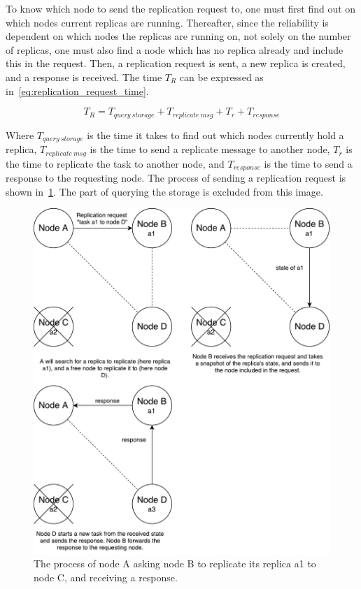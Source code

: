 \documentclass{cslthse-msc}
\begin{document}
To know which node to send the replication request to, one must first find out on which nodes current replicas are running. Thereafter, since the reliability is dependent on which nodes the replicas are running on, not solely on the number of replicas, one must also find a node which has no replica already and include this in the request. Then, a replication request is sent, a new replica is created, and a response is received. The time $T_R$ can be expressed as in~\cref{eq:replication_request_time}.

\begin{equation} \label{eq:replication_request_time}
T_R = T_{query\ storage} + T_{replicate\ msg} + T_{r} + T_{response}
\end{equation} 

Where $T_{query\ storage}$ is the time it takes to find out which nodes currently hold a replica, $T_{replicate\ msg}$ is the time to send a replicate message to another node, $T_{r}$ is the time to replicate the task to another node, and $T_{response}$ is the time to send a response to the requesting node. The process of sending a replication request is shown in~\cref{fig:replication_request}. The part of querying the storage is excluded from this image.

\begin{figure}[!hbt]
\centering
\includegraphics[scale=0.5]{images/replication_request.pdf}
\caption{The process of node A asking node B to replicate its replica a1 to node C, and receiving a response.}\label{fig:replication_request}
\end{figure}
\end{document}
